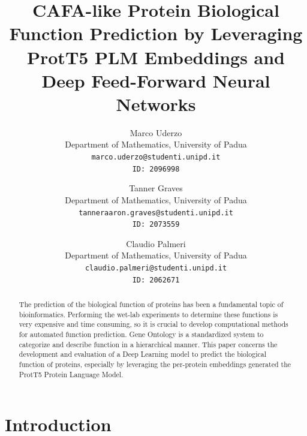 \documentclass[10pt,twocolumn,letterpaper]{article}
\begin{document}

\title{CAFA-like Protein Biological Function Prediction by Leveraging ProtT5 PLM Embeddings and Deep Feed-Forward Neural Networks}

\author{
Marco Uderzo\\
{\small Department of Mathematics, University of Padua}\\
{\tt\small marco.uderzo@studenti.unipd.it}\\
{\tt\small ID: 2096998} \\
\and
Tanner Graves\\
{\small Department of Mathematics, University of Padua}\\
{\tt\small tanneraaron.graves@studenti.unipd.it}\\
{\tt\small ID: 2073559} \\
\and
Claudio Palmeri \\
{\small Department of Mathematics, University of Padua}\\
{\tt\small claudio.palmeri@studenti.unipd.it}\\
{\tt\small ID: 2062671} \\
}


\maketitle


\begin{abstract}
    The prediction of the biological function of proteins has been a fundamental topic of bioinformatics. Performing the wet-lab experiments 
    to determine these functions is very expensive and time consuming, so it is crucial to develop computational 
    methods for automated function prediction. Gene Ontology is a standardized system to categorize and describe function 
    in a hierarchical manner.
    This paper concerns the development and evaluation of a Deep Learning model to predict the biological function of proteins, especially by leveraging the per-protein embeddings generated the ProtT5 Protein Language Model.
\end{abstract}

\section{Introduction}
\end{document}

